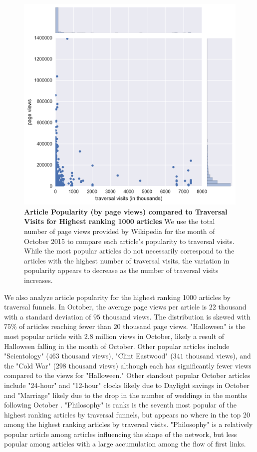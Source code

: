 \documentclass[pre,twocolumn,twoside,superscriptaddress,floatfix, aps, 10pt]{revtex4-1}
\begin{document}
\begin{figure}[tp!]
  \centering	
  \includegraphics[width=\columnwidth]{graphics/views_visits.png}
  \caption{
    \textbf{Article Popularity (by page views) compared to Traversal Visits 
    for Highest ranking 1000 articles}
    We use the total number of page views provided by Wikipedia for the month
    of October 2015 to compare each article's popularity to traversal visits.
    While the most popular articles do not necessarily correspond to the articles
    with the highest number of traversal visits, the variation in popularity appears to decrease as the number of traversal visits increases.
  }
  \label{fig:Views and Visits}

\end{figure}



We also analyze article popularity for the highest ranking 1000 articles by 
traversal funnels. In October, the average page views per article is 
$22$ thousand with a standard deviation of $95$ thousand views. The distribution
is skewed with $75\%$ of articles reaching fewer than $20$ thousand page views. 
"Halloween" is the most popular article with $2.8$ million views in October,
likely a result of Halloween falling in the month of October. 
Other popular articles include "Scientology" ($463$ thousand views), "Clint Eastwood" 
($341$ thousand views),
and the "Cold War" ($298$ thousand views) although each has significantly fewer views compared to the views for "Halloween."
Other standout popular October articles include "24-hour" and "12-hour" clocks likely due
to Daylight savings in October and "Marriage" likely due to the drop in the number of
weddings in the months following October
\cite{weddings}.
"Philosophy" is ranks is the seventh most popular of the highest ranking articles by traversal funnels, but appears no where in the top 20 among the highest ranking
articles by traversal visits. "Philosophy" is a relatively popular article 
among articles influencing the shape of the network, but less popular among 
articles with a large accumulation among the flow of first links.
\end{document}
